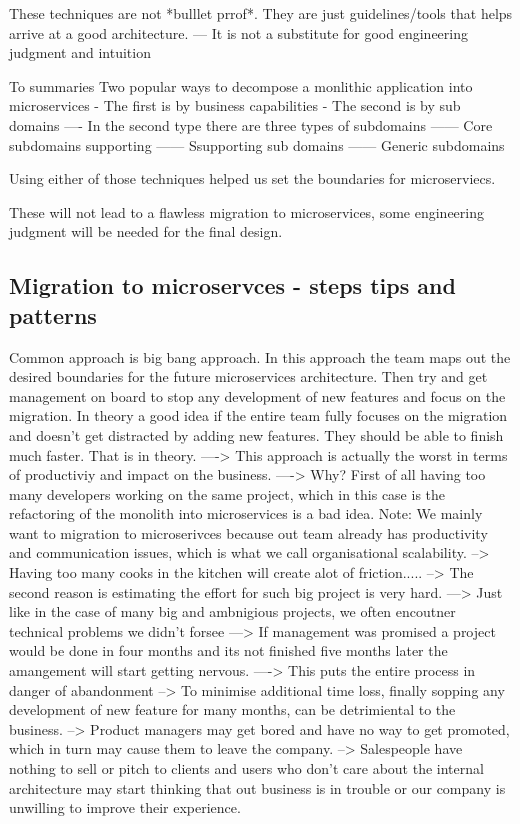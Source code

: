\documentclass[a4paper, 11pt]{book}
\begin{document}
    These techniques are not *bulllet prrof*. They are just guidelines/tools that helps arrive at a good architecture.
    --- It is not a substitute for good engineering judgment and intuition

    To summaries
    Two popular ways to decompose a monlithic application into microservices
    - The first is by business capabilities
    - The second is by sub domains
    ---- In the second type there are three types of subdomains
    ------ Core subdomains supporting
    ------ Ssupporting sub domains
    ------ Generic subdomains

    Using either of those techniques helped us set the boundaries for microserviecs.

    These will not lead to a flawless migration to microservices, some engineering judgment will be needed for the final design.

    \subsection{Migration to microservces - steps tips and patterns}
    Common approach is big bang approach.
    In this approach the team maps out the desired boundaries for the future microservices architecture.
    Then try and get management on board to stop any development of new features and focus on the migration.
    In theory a good idea if the entire team fully focuses on the migration and doesn't get distracted by adding new features. They should be able to finish much faster.
    That is in theory.
    ----> This approach is actually the worst in terms of productiviy and impact on the business.
    ----> Why?
    First of all having too many developers working on the same project, which in this case is the refactoring of the monolith into microservices is a bad idea.
    Note: We mainly want to migration to microserivces because out team already has productivity and communication issues, which is what we call organisational scalability.
    --> Having too many cooks in the kitchen will create alot of friction.....
    --> The second reason is estimating the effort for such big project is very hard.
    ---> Just like in the case of many big and ambnigious projects, we often encoutner technical problems we didn't forsee
    ---> If management was promised a project would be done in four months and its not finished five months later the amangement will start getting nervous.
    ----> This puts the entire process in danger of abandonment
    --> To minimise additional time loss, finally sopping any development of new feature for many months, can be detrimiental to the business.
    --> Product managers may get bored and have no way to get promoted, which in turn may cause them to leave the company.
    --> Salespeople have nothing to sell or pitch to clients and users who don't care about the internal architecture may start thinking that out business is in trouble or our company is unwilling to improve their experience.
\end{document}
